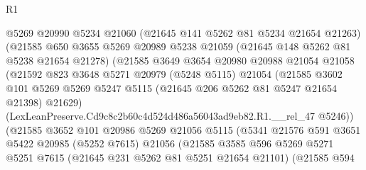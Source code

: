 \begin{lexlean}{R1}
\begin{coremodule}
                          @5269
                          @20990
                          @5234
                          @21060
                          (@21645 @141 @5262 @81 @5234 @21654 @21263)
                          (@21585
                            @650
                            @3655
                            @5269
                            @20989
                            @5238
                            @21059
                            (@21645 @148 @5262 @81 @5238 @21654 @21278)
                            (@21585
                              @3649
                              @3654
                              @20980
                              @20988
                              @21054
                              @21058
                              (@21592
                                @823
                                @3648
                                @5271
                                @20979
                                (@5248 @5115)
                                @21054
                                (@21585
                                  @3602
                                  @101
                                  @5269
                                  @5269
                                  @5247
                                  @5115
                                  (@21645 @206 @5262 @81 @5247 @21654 @21398)
                                  @21629)
                                (LexLeanPreserve.Cd9c8c2b60c4d524d486a56043ad9eb82.R1.__rel_47
                                  @5246))
                              (@21585
                                @3652
                                @101
                                @20986
                                @5269
                                @21056
                                @5115
                                (@5341
                                  @21576
                                  @591
                                  @3651
                                  @5422
                                  @20985
                                  (@5252 @7615)
                                  @21056
                                  (@21585
                                    @3585
                                    @596
                                    @5269
                                    @5271
                                    @5251
                                    @7615
                                    (@21645 @231 @5262 @81 @5251 @21654 @21101)
                                    (@21585
                                      @594

\end{coremodule}
\end{lexlean}
